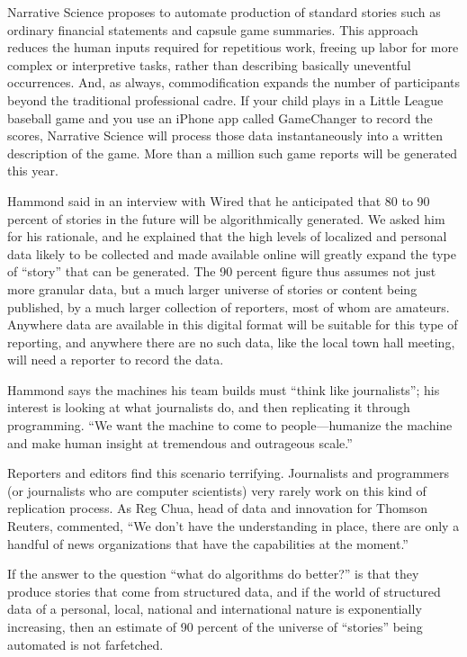 Narrative Science proposes to automate production of standard stories such as
ordinary financial statements and capsule game summaries. This approach reduces
the human inputs required for repetitious work, freeing up labor for more complex
or interpretive tasks, rather than describing basically uneventful occurrences.
And, as always, commodification expands the number of participants beyond the
traditional professional cadre. If your child plays in a Little League baseball game
and you use an iPhone app called GameChanger to record the scores, Narrative
Science will process those data instantaneously into a written description of the
game. More than a million such game reports will be generated this year.

Hammond said in an interview with Wired that he anticipated that 80 to
90 percent of stories in the future will be algorithmically generated. We asked
him for his rationale, and he explained that the high levels of localized and personal
data likely to be collected and made available online will greatly expand
the type of ``story'' that can be generated. The 90 percent figure thus assumes
not just more granular data, but a much larger universe of stories or content
being published, by a much larger collection of reporters, most of whom are
amateurs. Anywhere data are available in this digital format will be suitable for
this type of reporting, and anywhere there are no such data, like the local town
hall meeting, will need a reporter to record the data.

Hammond says the machines his team builds must ``think like journalists''; his
interest is looking at what journalists do, and then replicating it through programming.
``We want the machine to come to people—humanize the machine
and make human insight at tremendous and outrageous scale.''

Reporters and editors find this scenario terrifying. Journalists and programmers
(or journalists who are computer scientists) very rarely work on this kind of
replication process. As Reg Chua, head of data and innovation for Thomson
Reuters, commented, ``We don’t have the understanding in place, there are only
a handful of news organizations that have the capabilities at the moment.''

If the answer to the question ``what do algorithms do better?'' is that they produce
stories that come from structured data, and if the world of structured data
of a personal, local, national and international nature is exponentially increasing,
then an estimate of 90 percent of the universe of ``stories'' being automated is
not farfetched.

